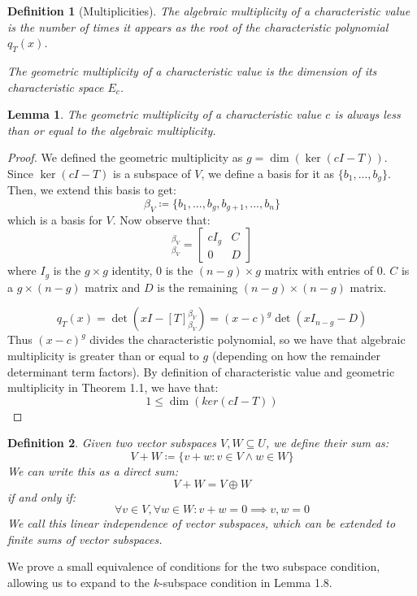 \documentclass[10pt,letterpaper]{article} %
\newtheorem{lem}{Lemma}[section]
\newtheorem{defn}{Definition}[section]
\begin{document}
\begin{defn}[Multiplicities]
The algebraic multiplicity of a characteristic value is the number of times it appears as the root of the characteristic polynomial $q_T(x)$.

The geometric multiplicity of a characteristic value is the dimension of its characteristic space $E_c$.
\end{defn}

\begin{lem}
The geometric multiplicity of a characteristic value $c$ is always less than or equal to the algebraic multiplicity.
\end{lem}
\begin{proof}
We defined the geometric multiplicity as $g = \dim(\ker(cI - T))$. Since $\ker(cI - T)$ is a subspace of $V$, we define a basis for it as $\{b_1, ..., b_g\}$. Then, we extend this basis to get:
\begin{equation*}
\beta_V \coloneq \{b_1, ..., b_g, b_{g+1}, ..., b_n\}
\end{equation*}
which is a basis for $V$. Now observe that:
\begin{equation*}
[T]_{\beta_V}^{\beta_V} = \begin{bmatrix}
cI_g & C\\
0 & D
\end{bmatrix}
\end{equation*}
where $I_g$ is the $g \times g$ identity, $0$ is the $(n-g)\times g$ matrix with entries of $0$. $C$ is a $g \times (n-g)$ matrix and $D$ is the remaining $(n-g) \times (n-g)$ matrix.

\begin{equation*}
q_T(x) = \det(xI - [T]_{\beta_V}^{\beta_V}) = (x-c)^g\det(xI_{n-g} - D)
\end{equation*}
Thus $(x-c)^g$ divides the characteristic polynomial, so we have that algebraic multiplicity is greater than or equal to $g$ (depending on how the remainder determinant term factors). By definition of characteristic value and geometric multiplicity in Theorem 1.1, we have that:
\begin{equation*}
1 \leqslant \dim(ker(cI - T))
\end{equation*}
\end{proof}

\begin{defn}
Given two vector subspaces $V, W \subseteq U$, we define their sum as:
\begin{equation*}
V + W \coloneq \{v + w : v \in V \land w \in W\}
\end{equation*}
We can write this as a direct sum:
\begin{equation*}
V + W = V \oplus W
\end{equation*}
if and only if:
\begin{equation*}
\forall v \in V, \forall w \in W: v+w = 0 \implies v, w = 0
\end{equation*}
We call this linear independence of vector subspaces, which can be extended to finite sums of vector subspaces.
\end{defn}
We prove a small equivalence of conditions for the two subspace condition, allowing us to expand to the $k$-subspace condition in Lemma 1.8.
\end{document}
